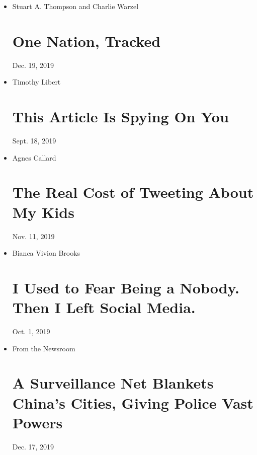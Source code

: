 \begin{itemize}
\item
  Stuart A. Thompson and Charlie Warzel

  \href{https://www.nytimes.com/interactive/2019/12/19/opinion/location-tracking-cell-phone.html}{}

  \hypertarget{one-nation-tracked}{%
  \section{One Nation, Tracked}\label{one-nation-tracked}}

  Dec. 19, 2019
\item
  Timothy Libert

  \href{https://www.nytimes.com/2019/09/18/opinion/data-privacy-tracking.html}{}

  \hypertarget{this-article-is-spying-on-you}{%
  \section{This Article Is Spying On
  You}\label{this-article-is-spying-on-you}}

  Sept. 18, 2019
\item
  Agnes Callard

  \href{https://www.nytimes.com/2019/11/22/opinion/sunday/social-media-kids.html}{}

  \hypertarget{the-real-cost-of-tweeting-about-my-kids}{%
  \section{The Real Cost of Tweeting About My
  Kids}\label{the-real-cost-of-tweeting-about-my-kids}}

  Nov. 11, 2019
\item
  Bianca Vivion Brooks

  \href{https://www.nytimes.com/2019/10/01/opinion/quit-social-media.html}{}

  \hypertarget{i-used-to-fear-being-a-nobody-then-i-left-social-media}{%
  \section{I Used to Fear Being a Nobody. Then I Left Social
  Media.}\label{i-used-to-fear-being-a-nobody-then-i-left-social-media}}

  Oct. 1, 2019
\item
  From the Newsroom

  \href{https://www.nytimes.com/2019/12/17/technology/china-surveillance.html}{}

  \hypertarget{a-surveillance-net-blankets-chinas-cities-giving-police-vast-powers}{%
  \section{A Surveillance Net Blankets China's Cities, Giving Police
  Vast
  Powers}\label{a-surveillance-net-blankets-chinas-cities-giving-police-vast-powers}}

  Dec. 17, 2019
\end{itemize}

